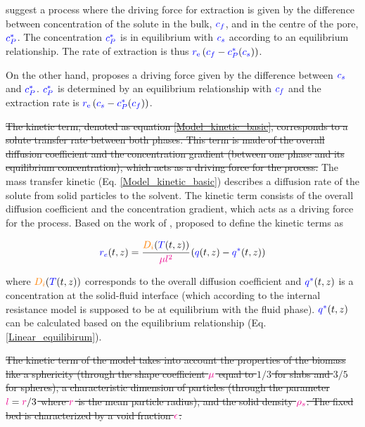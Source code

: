 \documentclass[../Article_Model_Parameters.tex]{subfiles}
\begin{document}
			\citet{Bulley1984} suggest a process where the driving force for extraction is given by the difference between concentration of the solute in the bulk, ${\color{blue}c_f}$, and in the centre of the pore, ${\color{blue}c_P^*}$. The concentration ${\color{blue}c_P^*}$ is in equilibrium with ${\color{blue}c_s}$ according to an equilibrium relationship. The rate of extraction is thus ${\color{blue}r_\text{e}}\left({\color{blue}c_f} - {\color{blue}c^*_P}({\color{blue}c_s})\right)$. 
			
			On the other hand, \citet{Reverchon1996} proposes a driving force given by the difference between ${\color{blue}c_s}$ and ${\color{blue}c_P^*}$. ${\color{blue}c_P^*}$ is determined by an equilibrium relationship with ${\color{blue}c_f}$ and the extraction rate is ${\color{blue}r_\text{e}}\left({\color{blue}c_s} - {\color{blue}c^*_P}({\color{blue}c_f})\right)$.
			
			\sout{The kinetic term, denoted as equation \ref{Model_kinetic_basic}, corresponds to a solute transfer rate between both phases. This term is made of the overall diffusion coefficient and the concentration gradient (between one phase and its equilibrium concentration), which acts as a driving force for the process.} {\color{blue}The mass transfer kinetic (Eq. \ref{Model_kinetic_basic}) describes a diffusion rate of the solute from solid particles to the solvent. The kinetic term consists of the overall diffusion coefficient and the concentration gradient, which acts as a driving force for the process.} Based on the work of \citet{Bulley1984}, \citet{Reverchon1996} proposed to define the kinetic terms as
			
			{\footnotesize
				\begin{equation} \label{Model_kinetic_basic}
					{\color{blue}r_e}(t,z) = \cfrac{{\color{orange}D_i}({\color{blue}T}(t,z))}{{\color{magenta} \mu l^2} }\left({\color{blue}q}(t,z) - {\color{blue}q^*}(t,z) \right)
			\end{equation} }
			
			where ${\color{orange}D_i}({\color{blue}T}(t,z))$ corresponds to the overall diffusion coefficient and ${\color{blue}q^*}(t,z)$ is a concentration at the solid-fluid interface (which according to the internal resistance model is supposed to be at equilibrium with the fluid phase). ${\color{blue}q^*}(t,z)$ can be calculated based on the equilibrium relationship (Eq.  \ref{Linear_equilibirum}). 
			
			\sout{The kinetic term of the model takes into account the properties of the biomass like a sphericity (through the shape coefficient ${\color{magenta}\mu}$ equal to $1/3$ for slabs and $3/5$ for spheres), a characteristic dimension of particles (through the parameter ${\color{magenta}l} = {\color{magenta}r}/3$ where ${\color{magenta}r}$ is the mean particle radius), and the solid density ${\color{magenta}\rho_s}$. The fixed bed is characterized by a void fraction ${\color{magenta}\epsilon}$. }
			
\end{document}
